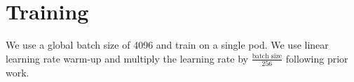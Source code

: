 \documentclass{article}
\begin{document}
\section{Training}

We use a global batch size of 4096 and train on a single pod.
We use linear learning rate warm-up and multiply the learning rate by
$\frac{\mbox{batch size}}{256}$ following prior work.
\end{document}
